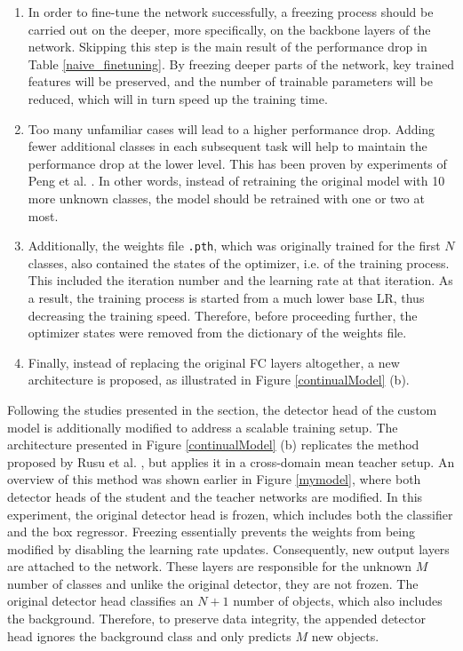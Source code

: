 \begin{enumerate}
\item In order to fine-tune the network successfully, a freezing process should be carried out on the deeper, more specifically, on the backbone layers of the network. Skipping this step is the main result of the performance drop in Table \ref{naive_finetuning}. By freezing deeper parts of the network, key trained features will be preserved, and the number of trainable parameters will be reduced, which will in turn speed up the training time. 
\item Too many unfamiliar cases will lead to a higher performance drop. Adding fewer additional classes in each subsequent task will help to maintain the performance drop at the lower level. This has been proven by experiments of Peng et al. \cite{Peng2020}. In other words, instead of retraining the original model with 10 more unknown classes, the model should be retrained with one or two at most. 
\item Additionally, the weights file \texttt{.pth}, which was originally trained for the first $N$ classes, also contained the states of the optimizer, i.e. of the training process. This included the iteration number and the learning rate at that iteration. As a result, the training process is started from a much lower base LR, thus decreasing the training speed. Therefore, before proceeding further, the optimizer states were removed from the dictionary of the weights file. 
\item Finally, instead of replacing the original FC layers altogether, a new architecture is proposed, as illustrated in Figure \ref{continualModel} (b). 
\end{enumerate}

Following the studies presented in the  section, the detector head of the custom model is additionally modified to address a scalable training setup. The architecture presented in Figure \ref{continualModel} (b) replicates the method proposed by Rusu et al. \cite{Rusu2016}, but applies it in a cross-domain mean teacher setup. An overview of this method was shown earlier in Figure \ref{mymodel}, where both detector heads of the student and the teacher networks are modified. In this experiment, the original detector head is frozen, which includes both the classifier and the box regressor. Freezing essentially prevents the weights from being modified by disabling the learning rate updates. Consequently, new output layers are attached to the network. These layers are responsible for the unknown $M$ number of classes and unlike the original detector, they are not frozen. The original detector head classifies an $N+1$ number of objects, which also includes the background. Therefore, to preserve data integrity, the appended detector head ignores the background class and only predicts $M$ new objects. 

